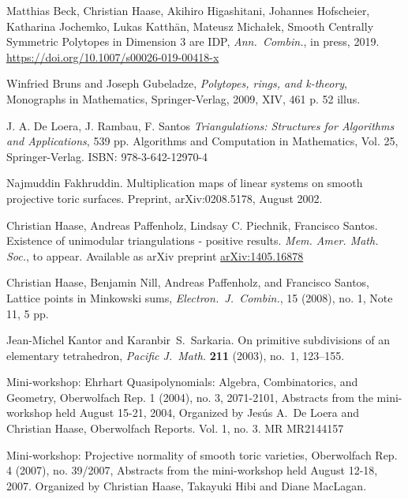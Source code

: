 \documentclass{amsart}
\theoremstyle{plain}
\theoremstyle{definition}
\begin{document}
\begin{thebibliography}{99}

Matthias Beck, Christian Haase, Akihiro Higashitani, Johannes Hofscheier, Katharina Jochemko, Lukas Katth\"an, Mateusz Micha{\l}ek,
Smooth Centrally Symmetric Polytopes in Dimension 3 are IDP,
\emph{Ann.~Combin.}, in press, 2019.
\url{https://doi.org/10.1007/s00026-019-00418-x}

Winfried Bruns and Joseph Gubeladze, \emph{Polytopes, rings, and k-theory}, Monographs in Mathematics,
  Springer-Verlag, 2009, XIV, 461 p. 52 illus.
  
J. A. De Loera, J. Rambau, F. Santos
\emph{Triangulations: Structures for Algorithms and Applications}, 539 pp.
Algorithms and Computation in Mathematics, Vol. 25, Springer-Verlag. 
ISBN: 978-3-642-12970-4

Najmuddin Fakhruddin.
\newblock Multiplication maps of linear systems on smooth projective toric surfaces.
  Preprint, arXiv:0208.5178, August 2002.
  
Christian Haase, Andreas Paffenholz, Lindsay C. Piechnik, Francisco Santos. Existence of unimodular triangulations - positive results. 
 \emph{Mem. Amer. Math. Soc.}, to appear.
 Available as arXiv preprint \href{https://arxiv.org/abs/1405.1687}{arXiv:1405.16878}
 
Christian Haase, Benjamin Nill, Andreas Paffenholz, and Francisco Santos, Lattice points in Minkowski sums, 
\emph{Electron.~J.~Combin.}, 15 (2008), no. 1, Note 11, 5 pp.

Jean-Michel Kantor and Karanbir~S.\ Sarkaria.
On primitive subdivisions of an elementary tetrahedron, 
\emph{Pacific J.~Math.} \textbf{211} (2003), no.~1,  123--155.

Mini-workshop: Ehrhart Quasipolynomials: Algebra, Combinatorics, and Geometry, Oberwolfach Rep. 1 (2004), no. 3, 2071-2101, Abstracts from the mini-workshop held August 15-21, 2004, Organized by Jes\'us A.~De Loera and Christian Haase, Oberwolfach Reports. Vol. 1, no. 3. MR MR2144157

Mini-workshop: Projective normality of smooth toric varieties, Oberwolfach Rep. 4 (2007), no. 39/2007, Abstracts from the mini-workshop held August 12-18, 2007. Organized by Christian Haase, Takayuki Hibi and Diane MacLagan.


\end{thebibliography}
\end{document}
